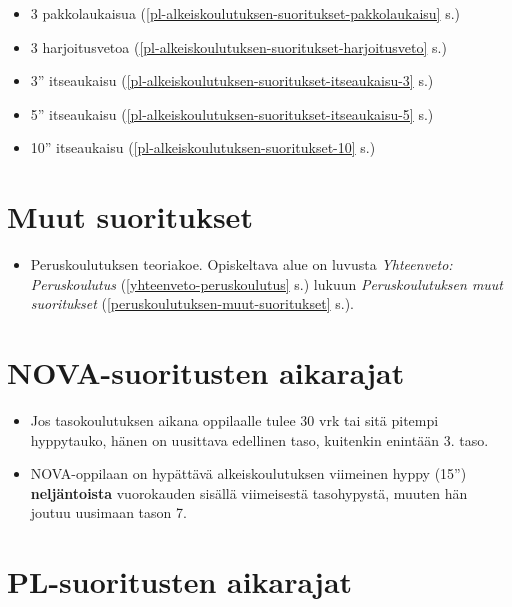 \begin{itemize}
\item  3 pakkolaukaisua (\ref{pl-alkeiskoulutuksen-suoritukset-pakkolaukaisu} s.\pageref{pl-alkeiskoulutuksen-suoritukset-pakkolaukaisu}) 
\item  3 harjoitusvetoa (\ref{pl-alkeiskoulutuksen-suoritukset-harjoitusveto} s.\pageref{pl-alkeiskoulutuksen-suoritukset-harjoitusveto}) 
\item  3'' itseaukaisu (\ref{pl-alkeiskoulutuksen-suoritukset-itseaukaisu-3} s.\pageref{pl-alkeiskoulutuksen-suoritukset-itseaukaisu-3}) 
\item  5'' itseaukaisu (\ref{pl-alkeiskoulutuksen-suoritukset-itseaukaisu-5} s.\pageref{pl-alkeiskoulutuksen-suoritukset-itseaukaisu-5}) 
\item  10'' itseaukaisu (\ref{pl-alkeiskoulutuksen-suoritukset-10} s.\pageref{pl-alkeiskoulutuksen-suoritukset-10}) 
\end{itemize}
\section{ Muut suoritukset }
\label{yhteenveto-alkeiskoulutus-muut-suoritukset}

\begin{itemize}
\item  Peruskoulutuksen teoriakoe. Opiskeltava alue on luvusta \textit{Yhteenveto: Peruskoulutus} (\ref{yhteenveto-peruskoulutus} s.\pageref{yhteenveto-peruskoulutus}) lukuun \textit{Peruskoulutuksen muut suoritukset} (\ref{peruskoulutuksen-muut-suoritukset} s.\pageref{peruskoulutuksen-muut-suoritukset}). 
\end{itemize}
\section{ NOVA-suoritusten aikarajat }
\label{yhteenveto-alkeiskoulutus-nova-suoritusten-aikarajat}

\begin{itemize}
\item  Jos tasokoulutuksen aikana oppilaalle tulee 30 vrk tai sitä pitempi hyppytauko, hänen on uusittava edellinen taso, kuitenkin enintään 3. taso.  
\item  NOVA-oppilaan on hypättävä alkeiskoulutuksen viimeinen hyppy (15'') \textbf{neljäntoista} vuorokauden sisällä viimeisestä tasohypystä, muuten hän joutuu uusimaan tason 7. 
\end{itemize}
\section{ PL-suoritusten aikarajat }
\label{yhteenveto-alkeiskoulutus-pl-suoritusten-aikarajat}


